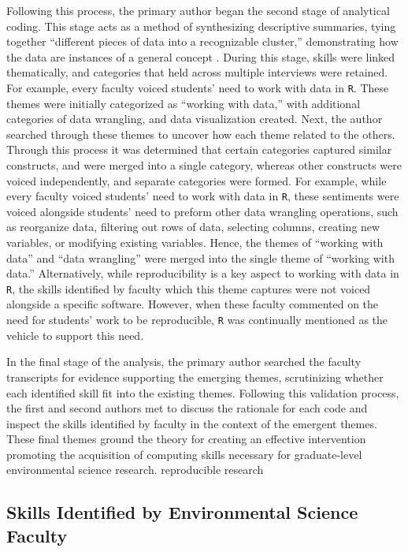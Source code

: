 \documentclass[12pt]{article}
\begin{document}
\quad Following this process, the primary author began the second stage of 
analytical coding. This stage acts as a method of synthesizing descriptive 
summaries, tying together ``different pieces of data into a recognizable 
cluster,'' demonstrating how the data are instances of a general concept 
\citep[p. 95]{miles}. During this stage, skills were linked thematically, and 
categories that held across multiple interviews were retained. For example, 
every faculty voiced students' need to work with data in \texttt{R}. These 
themes were initially categorized as ``working with data,'' with additional 
categories of data wrangling, and data visualization created. Next, the author
searched through these themes to uncover how each theme related to the others.
Through this process it was determined that certain categories captured similar
constructs, and were merged into a single category, whereas other constructs
were voiced independently, and separate categories were formed. For example,
while every faculty voiced students' need to work with data in \texttt{R}, these
sentiments were voiced alongside students' need to preform other data wrangling
operations, such as reorganize data, filtering out rows of data, selecting
columns, creating new variables, or modifying existing variables. Hence, the
themes of ``working with data'' and ``data wrangling'' were merged into the
single theme of ``working with data.'' Alternatively, while reproducibility is
a key aspect to working with data in \texttt{R}, the skills identified by
faculty which this theme captures were not voiced alongside a specific software.
However, when these faculty commented on the need for students' work to be 
reproducible, \texttt{R} was continually mentioned as the vehicle to support 
this need. 

\quad In the final stage of the analysis, the primary author searched the 
faculty transcripts for evidence supporting the emerging themes, scrutinizing 
whether each identified skill fit into the existing themes. Following this 
validation process, the first and second authors met to discuss the rationale
for each code and inspect the skills identified by faculty in the context of the
emergent themes. These final themes ground the theory for creating an effective
intervention promoting the acquisition of computing skills necessary for 
graduate-level environmental science research. reproducible
research

\subsection{Skills Identified by Environmental Science Faculty}
\end{document}

